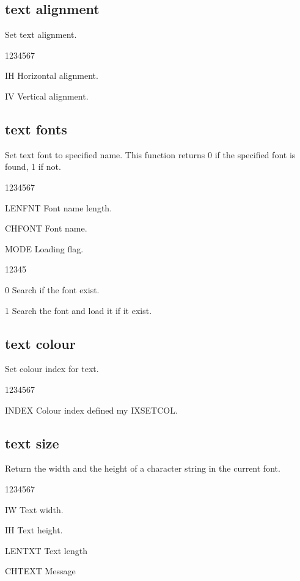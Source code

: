 \subsection{ text alignment}
%
\Action
Set text alignment.
\Pdesc
\begin{DLtt}{1234567}
\item[IH] Horizontal alignment.
\item[IV] Vertical alignment.
\end{DLtt}
\subsection{ text fonts}
%
\Action
Set text font to specified name. This function returns 0 if
the specified font is found, 1 if not.
\Pdesc
\begin{DLtt}{1234567}
\item[LENFNT] Font name length.
\item[CHFONT] Font name.
\item[MODE] Loading flag.
\begin{DLtt}{12345}
\item[0] Search if the font exist.
\item[1] Search the font and load it if it exist.
\end{DLtt}
\end{DLtt}
\subsection{ text colour}
%
\Action
Set colour index for text.
\Pdesc
\begin{DLtt}{1234567}
\item[INDEX] Colour index defined my IXSETCOL.
\end{DLtt}
\subsection{ text size}
%
\Action
Return the width and the height of a character string in the current font.
\Pdesc
\begin{DLtt}{1234567}
\item[IW] Text width.
\item[IH] Text height.
\item[LENTXT] Text length
\item[CHTEXT] Message
\end{DLtt}



